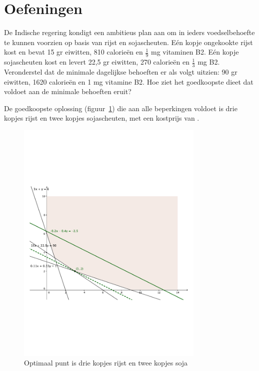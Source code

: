\section{Oefeningen}
\begin{oef}
De Indische regering kondigt een ambitieus plan aan om in
ieders voedselbehoefte te kunnen voorzien op basis van rijst en
sojascheuten. E\'{e}n kopje ongekookte rijst kost  en bevat
15 gr eiwitten, 810 calorie\"{e}n en $\frac{1}{9}$ mg vitaminen
B2. E\'{e}n kopje sojascheuten kost  en
levert 22,5 gr eiwitten, 270 calorie\"{e}n en $\frac{1}{3}$ mg
B2. Veronderstel dat de minimale dagelijkse
behoeften er als volgt uitzien: 90 gr eiwitten, 1620 calorie\"{e}n
en 1 mg vitamine B2.
Hoe ziet het goedkoopste
dieet dat voldoet aan de minimale behoeften eruit?
\begin{opl}
  De goedkoopste oplossing (figuur~\ref{fig:oplrijstsoja}) die aan alle beperkingen voldoet is drie kopjes rijst en twee kopjes sojascheuten, met een kostprijs van . 
  \begin{figure}[hbtp]
    \centering
    \includegraphics[width=0.8\textwidth]{oefeningen/FigurenLP/OefRijstSoja.pdf}
    \caption{Optimaal punt is drie kopjes rijst en twee kopjes soja}
    \label{fig:oplrijstsoja}
  \end{figure}
\end{opl}
\end{oef}
 
